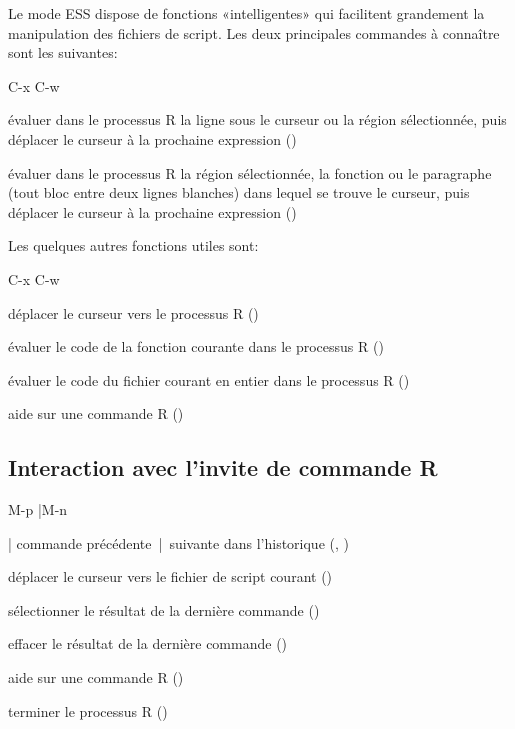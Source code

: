 Le mode ESS dispose de fonctions «intelligentes» qui facilitent
grandement la manipulation des fichiers de script. Les deux
principales commandes à connaître sont les suivantes:
\begin{ttscript}{C-x C-w}
  \raggedright
\item[\code{C-RET}] évaluer dans le processus R la ligne sous le
  curseur ou la région sélectionnée, puis déplacer le curseur à la
  prochaine expression ()
\item[\code{C-c C-c}] évaluer dans le processus R la région
  sélectionnée, la fonction ou le paragraphe (tout bloc entre deux
  lignes blanches) dans lequel se trouve le curseur, puis déplacer le
  curseur à la prochaine expression
  ()
\end{ttscript}
Les quelques autres fonctions utiles sont:
\begin{ttscript}{C-x C-w}
  \raggedright
\item[\code{C-c C-z}] déplacer le curseur vers le processus R
  ()
\item[\code{C-c C-f}] évaluer le code de la fonction courante dans
  le processus R ()
\item[\code{C-c C-l}] évaluer le code du fichier courant en entier dans
  le processus R ()
\item[\code{C-c C-v}] aide sur une commande R
  ()
\end{ttscript}

\subsection{Interaction avec l'invite de commande R}
\label{emacs+ess:commandes:invite}

\begin{ttscript}{M-p |M-n}
  \raggedright
\item[\code{M-p} | \code{M-n}] commande précédente~|~suivante
  dans l'historique (,
  )
\item[\code{C-c C-z}] déplacer le curseur vers le fichier de script
  courant ()
\item[\code{M-h}] sélectionner le résultat de la dernière commande
  ()
\item[\code{C-c C-o}] effacer le résultat de la dernière commande
  ()
\item[\code{C-c C-v}] aide sur une commande R
  ()
\item[\code{C-c C-q}] terminer le processus R ()
\end{ttscript}

